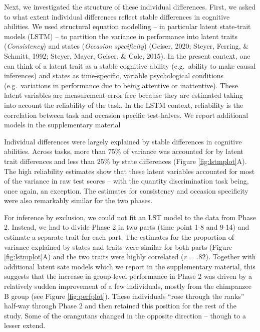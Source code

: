\documentclass[
  man,floatsintext]{apa6}
\begin{document}
Next, we investigated the structure of these individual differences. First, we asked to what extent individual differences reflect stable differences in cognitive abilities. We used structural equation modelling -- in particular latent state-trait models (LSTM) -- to partition the variance in performance into latent traits (\emph{Consistency}) and states (\emph{Occasion specificity}) (Geiser, 2020; Steyer, Ferring, \& Schmitt, 1992; Steyer, Mayer, Geiser, \& Cole, 2015). In the present context, one can think of a latent trait as a stable cognitive ability (e.g.~ability to make causal inferences) and states as time-specific, variable psychological conditions (e.g.~variations in performance due to being attentive or inattentive). These latent variables are measurement-error free because they are estimated taking into account the reliability of the task. In the LSTM context, reliability is the correlation between task and occasion specific test-halves. We report additional models in the supplementary material

Individual differences were largely explained by stable differences in cognitive abilities. Across tasks, more than 75\% of variance was accounted for by latent trait differences and less than 25\% by state differences (Figure \ref{fig:lstmplot}A). The high reliability estimates show that these latent variables accounted for most of the variance in raw test scores -- with the quantity discrimination task being, once again, an exception. The estimates for consistency and occasion specificity were also remarkably similar for the two phases.

For inference by exclusion, we could not fit an LST model to the data from Phase 2. Instead, we had to divide Phase 2 in two parts (time point 1-8 and 9-14) and estimate a separate trait for each part. The estimates for the proportion of variance explained by states and traits were similar for both parts (Figure \ref{fig:lstmplot}A) and the two traits were highly correlated (\emph{r} = .82). Together with additional latent sate models which we report in the supplementary material, this suggests that the increase in group-level performance in Phase 2 was driven by a relatively sudden improvement of a few individuals, mostly from the chimpanzee B group (see Figure \ref{fig:perfplot}). These individuals ``rose through the ranks'' half-way through Phase 2 and then retained this position for the rest of the study. Some of the orangutans changed in the opposite direction -- though to a lesser extend.
\end{document}
